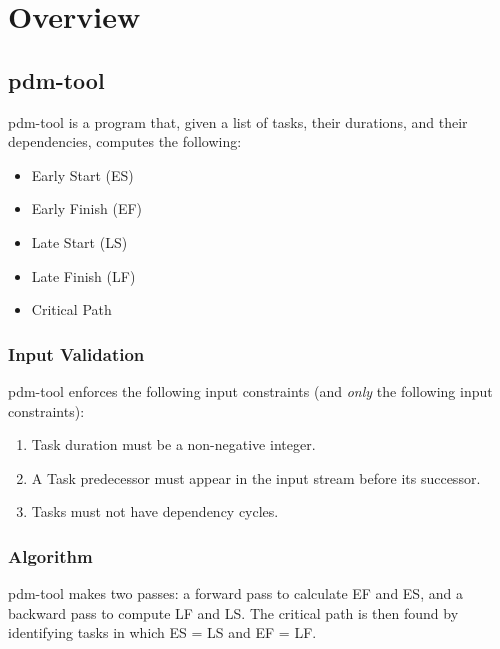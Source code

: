\chapter{Overview}

\section{pdm-tool}

pdm-tool is a program that, given a list of tasks, their durations, and
their dependencies, computes the following:

\begin{itemize}
    \item Early Start (ES)
    \item Early Finish (EF)
    \item Late Start (LS)
    \item Late Finish (LF)
    \item Critical Path
\end{itemize}

\subsection{Input Validation}

pdm-tool enforces the following input constraints (and \textit{only} the
following input constraints):

\begin{enumerate}
    \item Task duration must be a non-negative integer.
    \item A Task predecessor must appear in the input stream before its
          successor.
    \item Tasks must not have dependency cycles.
\end{enumerate}

\subsection{Algorithm}

pdm-tool makes two passes: a forward pass to calculate EF and ES, and a
backward pass to compute LF and LS. The critical path is then found by
identifying tasks in which ES = LS and EF = LF.
